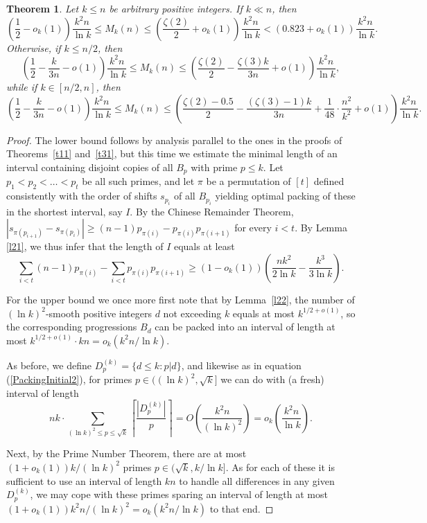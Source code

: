 \documentclass[12pt]{amsart}
\newtheorem{theorem}{Theorem}
\theoremstyle{plain}
\numberwithin{equation}{section}
\begin{document}
	\begin{theorem}\label{t41}
		Let $k\leqslant n$ be arbitrary positive integers. If $k\ll n$, then 
		$$\left(\frac{1}{2}-o_k(1)\right)\frac{k^2n}{\ln k}\leqslant M_k(n) \leqslant \left(\frac{\zeta(2)}{2}+o_k(1)\right)\frac{k^2n}{\ln k}
		<\left(0.823+o_k(1)\right)\frac{k^2n}{\ln k}.$$
		Otherwise, if $k\leqslant n/2$, then 
		$$\left(\frac{1}{2}-\frac{k}{3n}-o(1)\right)\frac{k^2n}{\ln k} \leqslant M_k(n)\leqslant \left(\frac{\zeta(2)}{2}-\frac{\zeta(3)k}{3n}+o(1)\right)\frac{k^2n}{\ln k},$$
		while if $k\in[n/2,n]$, then
		$$\left(\frac{1}{2}-\frac{k}{3n}-o(1)\right)\frac{k^2n}{\ln k} \leqslant M_k(n)
		\leqslant \left(\frac{\zeta(2)-0.5}{2}-\frac{(\zeta(3)-1)k}{3n}
		+\frac{1}{48}\cdot\frac{n^2}{k^2}
		+o(1)\right)\frac{k^2n}{\ln k}.$$
	\end{theorem}
	\begin{proof} 
		The lower bound follows by analysis parallel 
		to the ones in the proofs of Theorems~\ref{t11} and~\ref{t31}, but this time we estimate the minimal length of an interval containing disjoint copies of all $B_p$ with prime $p\leqslant k$. 
		Let $p_1<p_2< \ldots <p_t$ be all such primes, and let $\pi$ be
	a permutation of $[t]$ defined consistently with 
	the order of shifts $s_{p_i}$ of all $B_{p_i}$ yielding optimal packing of these in the shortest interval, say $I$.
	By the Chinese Remainder Theorem, $|s_{\pi(p_{i+1})}-s_{\pi(p_i)}|\geqslant (n-1)p_{\pi(i)} - p_{\pi(i)} p_{\pi(i+1)}$ for every $i<t$. By Lemma \ref{l21}, we thus infer that the length of $I$ equals at least 
	$$\sum_{i <t} (n-1)p_{\pi(i)} - \sum_{i <t} p_{\pi(i)} p_{\pi(i+1)} 
	\geqslant (1-o_k(1))\left(\frac{nk^2}{2\ln k} - \frac{k^3}{3\ln k}\right).$$	
	
		
		For the upper bound we once more first note that by Lemma~\ref{l22}, the number of $(\ln k)^2$-smooth positive integers $d$ not exceeding $k$ equals at most  $k^{1/2+o(1)}$, so the corresponding progressions $B_d$ can be packed into an interval of length at most $k^{1/2+o(1)}\cdot kn = o_k(k^2n/\ln k)$.
		
		As before, we define $D_p^{(k)}=\{d\leqslant k : p | d\}$, and likewise as in equation (\ref{PackingInitial2}), for primes $p\in ((\ln k)^2,\sqrt{k}]$ we can do with (a fresh) interval of length
		$$nk\cdot\sum_{(\ln k)^2\leqslant p\leqslant \sqrt{k}}\left\lceil\frac{|D_p^{(k)}|}{p}\right\rceil 
		= O\left(\frac{k^2n}{(\ln k)^2}\right)
		= o_k\left(\frac{k^2n}{\ln k}\right).$$
		
		Next, by the Prime Number Theorem, there are at most $(1+o_k(1))k/(\ln k)^2$ primes $p\in(\sqrt{k},k/\ln k]$. As for each of these it is sufficient to use an interval of length $kn$ to handle all differences in any given $D_p^{(k)}$, we may cope with these primes sparing an interval of length at most $(1+o_k(1))k^2n/(\ln k)^2 = o_k(k^2n/\ln k)$ to that end. 
		

\end{proof}
\end{document}
